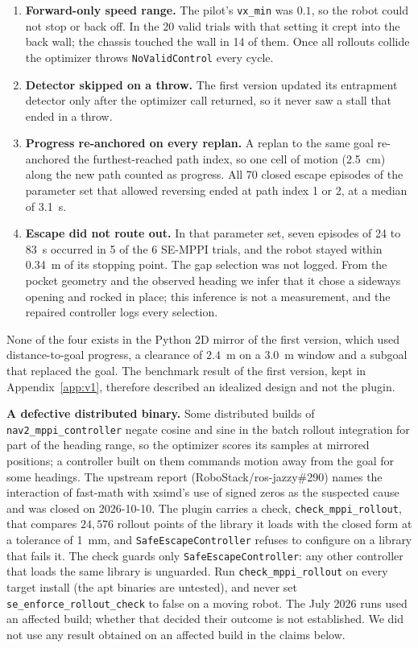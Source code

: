 \documentclass[journal]{IEEEtran}
\begin{document}
\begin{enumerate}
\item \textbf{Forward-only speed range.} The pilot's \texttt{vx\_min} was
  $0.1$, so the robot could not stop or back off. In the 20 valid trials with
  that setting it crept into the back wall; the chassis touched the wall in 14 of them. Once all
  rollouts collide the optimizer throws \texttt{NoValidControl} every cycle.
\item \textbf{Detector skipped on a throw.} The first version updated its
  entrapment detector only after the optimizer call returned, so it never
  saw a stall that ended in a throw.
\item \textbf{Progress re-anchored on every replan.} A replan to the same
  goal re-anchored the furthest-reached path index, so one cell of motion
  (2.5~cm) along the new path counted as progress. All 70 closed escape
  episodes of the parameter set that allowed reversing ended at path index 1 or 2,
  at a median of 3.1~s.
\item \textbf{Escape did not route out.} In that parameter set, seven episodes
  of 24 to 83~s occurred in 5 of the 6 SE-MPPI trials, and the robot stayed within
  0.34~m of its stopping point. The gap selection was not logged. From
  the pocket geometry and the observed heading we infer that it chose a
  sideways opening and rocked in place; this inference is not a measurement,
  and the repaired controller logs every selection.
\end{enumerate}

None of the four exists in the Python 2D mirror of the first version, which used
distance-to-goal progress, a clearance of $2.4$~m on a $3.0$~m window and a subgoal that
replaced the goal. The benchmark result of the first version, kept in
Appendix~\ref{app:v1}, therefore described an idealized design and not the plugin.

\textbf{A defective distributed binary.} Some distributed builds of
\texttt{nav2\_mppi\_controller} negate cosine and sine in the batch
rollout integration for part of the heading range, so the optimizer scores its
samples at mirrored positions; a controller built on them commands motion away
from the goal for some headings. The upstream report
(RoboStack/ros-jazzy\#290) names the interaction of fast-math with xsimd's
use of signed zeros as the suspected cause and was closed on 2026-10-10. The
plugin carries a check, \texttt{check\_mppi\_rollout}, that compares $24{,}576$ rollout points of
the library it loads with the closed form at a tolerance of 1~mm, and
\texttt{SafeEscapeController} refuses to configure on a library that fails
it. The check guards only \texttt{SafeEscapeController}: any other controller that loads the
same library is unguarded. Run \texttt{check\_mppi\_rollout} on every target install (the apt
binaries are untested), and never set \texttt{se\_enforce\_rollout\_check} to false on a
moving robot. The July 2026 runs used an affected build; whether that decided
their outcome is not established. We did not use any result obtained on an
affected build in the claims below.
\end{document}
